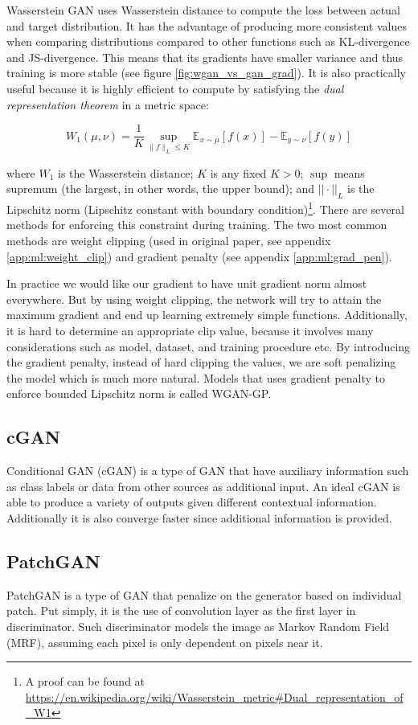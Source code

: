 Wasserstein GAN uses Wasserstein distance to compute the loss between actual and target distribution. It has the advantage of producing more consistent values when comparing distributions compared to other functions such as KL-divergence and JS-divergence. This means that its gradients have smaller variance and thus training is more stable (see figure \ref{fig:wgan_vs_gan_grad}). It is also practically useful because it is highly efficient to compute by satisfying the \textit{dual representation theorem} in a metric space:

$$
W_{1}(\mu, \nu)=\frac{1}{K} \sup _{\|f\|_{L} \leq K} \mathbb{E}_{x \sim \mu}[f(x)]-\mathbb{E}_{y \sim \nu}[f(y)]
$$

where $W_1$ is the Wasserstein distance; $K$ is any fixed $K > 0$; $\sup$ means supremum (the largest, in other words, the upper bound); and $||\cdot||_L$ is the Lipschitz norm (Lipschitz constant with boundary condition)\footnote{A proof can be found at \url{https://en.wikipedia.org/wiki/Wasserstein\_metric\#Dual\_representation\_of\_W1}}. There are several methods for enforcing this constraint during training. The two most common methods are weight clipping (used in original paper, see appendix \ref{app:ml:weight_clip}) and gradient penalty (see appendix \ref{app:ml:grad_pen}).

In practice we would like our gradient to have unit gradient norm almost everywhere. But by using weight clipping, the network will try to attain the maximum gradient and end up learning extremely simple functions\cite{gulrajaniImprovedTrainingWasserstein2017}. Additionally, it is hard to determine an appropriate clip value, because it involves many considerations such as model, dataset, and training procedure etc. By introducing the gradient penalty, instead of hard clipping the values, we are soft penalizing the model which is much more natural. Models that uses gradient penalty to enforce bounded Lipschitz norm is called WGAN-GP.

\subsection{cGAN}
Conditional GAN (cGAN) is a type of GAN that have auxiliary information such as class labels or data from other sources as additional input. An ideal cGAN is able to produce a variety of outputs given different contextual information. Additionally it is also converge faster since additional information is provided.


\subsection{PatchGAN}
PatchGAN is a type of GAN that penalize on the generator based on individual patch. Put simply, it is the use of convolution layer as the first layer in discriminator. Such discriminator models the image as Markov Random Field (MRF), assuming each pixel is only dependent on pixels near it.


